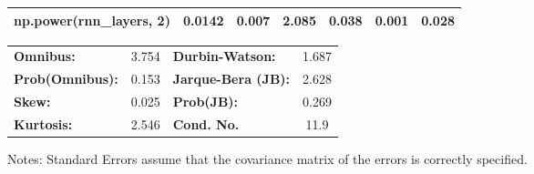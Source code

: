 \begin{center}
\begin{tabular}{lcccccc}
\textbf{np.power(rnn\_layers, 2)}         &       0.0142  &        0.007     &     2.085  &         0.038        &        0.001    &        0.028     \\
\bottomrule
\end{tabular}
\begin{tabular}{lclc}
\textbf{Omnibus:}       &  3.754 & \textbf{  Durbin-Watson:     } &    1.687  \\
\textbf{Prob(Omnibus):} &  0.153 & \textbf{  Jarque-Bera (JB):  } &    2.628  \\
\textbf{Skew:}          &  0.025 & \textbf{  Prob(JB):          } &    0.269  \\
\textbf{Kurtosis:}      &  2.546 & \textbf{  Cond. No.          } &     11.9  \\
\bottomrule
\end{tabular}
\end{center}

Notes: \newline
 [1] Standard Errors assume that the covariance matrix of the errors is correctly specified.